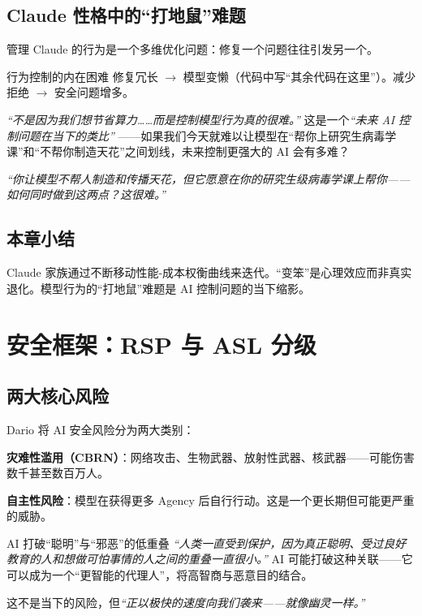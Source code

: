 \documentclass[a4paper]{article}
\begin{document}
\subsection{Claude 性格中的``打地鼠''难题}

管理 Claude 的行为是一个多维优化问题：修复一个问题往往引发另一个。

\begin{knowledgebox}{行为控制的内在困难}
修复冗长 $\to$ 模型变懒（代码中写``其余代码在这里''）。减少拒绝 $\to$ 安全问题增多。

\textit{``不是因为我们想节省算力……而是控制模型行为真的很难。''} 这是一个\textit{``未来 AI 控制问题在当下的类比''} ——如果我们今天就难以让模型在``帮你上研究生病毒学课''和``不帮你制造天花''之间划线，未来控制更强大的 AI 会有多难？

\textit{``你让模型不帮人制造和传播天花，但它愿意在你的研究生级病毒学课上帮你——如何同时做到这两点？这很难。''}
\end{knowledgebox}

\subsection{本章小结}

Claude 家族通过不断移动性能-成本权衡曲线来迭代。``变笨''是心理效应而非真实退化。模型行为的``打地鼠''难题是 AI 控制问题的当下缩影。

\section{安全框架：RSP 与 ASL 分级}

\subsection{两大核心风险}

Dario 将 AI 安全风险分为两大类别：

\textbf{灾难性滥用（CBRN）}：网络攻击、生物武器、放射性武器、核武器——可能伤害数千甚至数百万人。

\textbf{自主性风险}：模型在获得更多 Agency 后自行行动。这是一个更长期但可能更严重的威胁。

\begin{warningbox}{AI 打破``聪明''与``邪恶''的低重叠}
\textit{``人类一直受到保护，因为真正聪明、受过良好教育的人和想做可怕事情的人之间的重叠一直很小。''} AI 可能打破这种关联——它可以成为一个``更智能的代理人''，将高智商与恶意目的结合。

这不是当下的风险，但\textit{``正以极快的速度向我们袭来——就像幽灵一样。''}
\end{warningbox}
\end{document}
